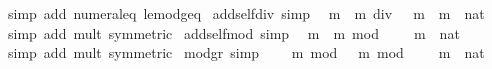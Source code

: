 \begin{isabellebody}
\ {\isacharparenleft}{\kern0pt}simp\ add{\isacharcolon}{\kern0pt}\ numeral{\isacharunderscore}{\kern0pt}{}{\isacharunderscore}{\kern0pt}eq{\isacharunderscore}{\kern0pt}{}\ le{\isacharunderscore}{\kern0pt}mod{\isacharunderscore}{\kern0pt}geq{\isacharparenright}{\kern0pt}%
\endisatagproof
{\isafoldproof}%
%
\isadelimproof
\isanewline
%
\endisadelimproof
\isanewline
{}\isamarkupfalse%
\ add{\isacharunderscore}{\kern0pt}self{\isacharunderscore}{\kern0pt}div{\isacharunderscore}{\kern0pt}{}\ {\isacharbrackleft}{\kern0pt}simp{\isacharbrackright}{\kern0pt}{\isacharcolon}{\kern0pt}\isanewline
\ \ {\isachardoublequoteopen}{\isacharparenleft}{\kern0pt}m\ {\isacharplus}{\kern0pt}\ m{\isacharparenright}{\kern0pt}\ div\ {}\ {\isacharequal}{\kern0pt}\ m{\isachardoublequoteclose}\ \ m\ {\isacharcolon}{\kern0pt}{\isacharcolon}{\kern0pt}\ nat\isanewline
%
\isadelimproof
\ \ %
\endisadelimproof
%
\isatagproof
{}\isamarkupfalse%
\ {\isacharparenleft}{\kern0pt}simp\ add{\isacharcolon}{\kern0pt}\ mult{\isacharunderscore}{\kern0pt}{}\ {\isacharbrackleft}{\kern0pt}symmetric{\isacharbrackright}{\kern0pt}{\isacharparenright}{\kern0pt}%
\endisatagproof
{\isafoldproof}%
%
\isadelimproof
\isanewline
%
\endisadelimproof
\isanewline
{}\isamarkupfalse%
\ add{\isacharunderscore}{\kern0pt}self{\isacharunderscore}{\kern0pt}mod{\isacharunderscore}{\kern0pt}{}\ {\isacharbrackleft}{\kern0pt}simp{\isacharbrackright}{\kern0pt}{\isacharcolon}{\kern0pt}\isanewline
\ \ {\isachardoublequoteopen}{\isacharparenleft}{\kern0pt}m\ {\isacharplus}{\kern0pt}\ m{\isacharparenright}{\kern0pt}\ mod\ {}\ {\isacharequal}{\kern0pt}\ {}{\isachardoublequoteclose}\ \ m\ {\isacharcolon}{\kern0pt}{\isacharcolon}{\kern0pt}\ nat\isanewline
%
\isadelimproof
\ \ %
\endisadelimproof
%
\isatagproof
{}\isamarkupfalse%
\ {\isacharparenleft}{\kern0pt}simp\ add{\isacharcolon}{\kern0pt}\ mult{\isacharunderscore}{\kern0pt}{}\ {\isacharbrackleft}{\kern0pt}symmetric{\isacharbrackright}{\kern0pt}{\isacharparenright}{\kern0pt}%
\endisatagproof
{\isafoldproof}%
%
\isadelimproof
\isanewline
%
\endisadelimproof
\isanewline
{}\isamarkupfalse%
\ mod{}{\isacharunderscore}{\kern0pt}gr{\isacharunderscore}{\kern0pt}{}\ {\isacharbrackleft}{\kern0pt}simp{\isacharbrackright}{\kern0pt}{\isacharcolon}{\kern0pt}\isanewline
\ \ {\isachardoublequoteopen}{}\ {\isacharless}{\kern0pt}\ m\ mod\ {}\ {\isasymlongleftrightarrow}\ m\ mod\ {}\ {\isacharequal}{\kern0pt}\ {}{\isachardoublequoteclose}\ \ m\ {\isacharcolon}{\kern0pt}{\isacharcolon}{\kern0pt}\ nat\isanewline

\end{isabellebody}
